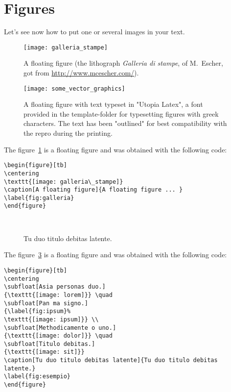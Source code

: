 \lipsum[1-2]


\section{Figures}
Let's see now how to put one or several images in your text.


\begin{figure}[tb] 
\centering 
\texttt{[image: galleria\_stampe]} 
\caption[A floating figure]{A floating figure (the lithograph \emph{Galleria di stampe}, of M.~Escher, got from \url{http://www.mcescher.com/}).}
\label{fig:galleria} 
\end{figure}

\begin{figure}[tb] 
\centering 
\texttt{[image: some\_vector\_graphics]} 
\caption[A floating figure]{A floating figure with text typeset in "Utopia Latex", a font provided in the template-folder for typesetting figures with greek characters. The text has been "outlined" for best compatibility with the repro during the printing.}
\label{fig:vector_graphics} 
\end{figure}


The figure~\ref{fig:galleria} is a floating figure and was obtained with the following code:
\begin{lstlisting}
\begin{figure}[tb] 
\centering 
\texttt{[image: galleria\_stampe]} 
\caption[A floating figure]{A floating figure ... }
\label{fig:galleria} 
\end{figure}
\end{lstlisting}


\lipsum[1-2]

\begin{figure}[tb]
\centering

 \quad
{} \\
 \quad
{}
\caption[Tu duo titulo debitas latente]{Tu duo titulo debitas
latente.}
\label{fig:esempio}
\end{figure}

The figure~\ref{fig:esempio} is a floating figure and was obtained with the following code:
\begin{lstlisting}
\begin{figure}[tb]
\centering
\subfloat[Asia personas duo.]
{\texttt{[image: lorem]}} \quad
\subfloat[Pan ma signo.]
{\label{fig:ipsum}%
\texttt{[image: ipsum]}} \\
\subfloat[Methodicamente o uno.]
{\texttt{[image: dolor]}} \quad
\subfloat[Titulo debitas.]
{\texttt{[image: sit]}}
\caption[Tu duo titulo debitas latente]{Tu duo titulo debitas latente.}
\label{fig:esempio}
\end{figure}
\end{lstlisting}



